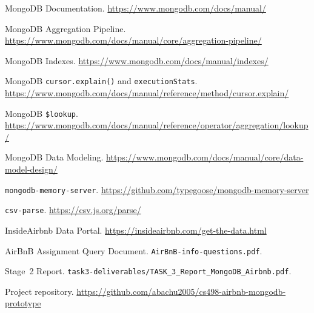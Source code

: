 \documentclass[10pt]{article}
\begin{document}
\begin{enumerate}[label={[\arabic*]}]
\item MongoDB Documentation. \url{https://www.mongodb.com/docs/manual/}
\item MongoDB Aggregation Pipeline. \url{https://www.mongodb.com/docs/manual/core/aggregation-pipeline/}
\item MongoDB Indexes. \url{https://www.mongodb.com/docs/manual/indexes/}
\item MongoDB \texttt{cursor.explain()} and \texttt{executionStats}. \url{https://www.mongodb.com/docs/manual/reference/method/cursor.explain/}
\item MongoDB \texttt{\$lookup}. \url{https://www.mongodb.com/docs/manual/reference/operator/aggregation/lookup/}
\item MongoDB Data Modeling. \url{https://www.mongodb.com/docs/manual/core/data-model-design/}
\item \texttt{mongodb-memory-server}. \url{https://github.com/typegoose/mongodb-memory-server}
\item \texttt{csv-parse}. \url{https://csv.js.org/parse/}
\item InsideAirbnb Data Portal. \url{https://insideairbnb.com/get-the-data.html}
\item AirBnB Assignment Query Document. \texttt{AirBnB-info-questions.pdf}.
\item Stage~2 Report. \texttt{task3-deliverables/TASK\_3\_Report\_MongoDB\_Airbnb.pdf}.
\item Project repository. \url{https://github.com/abachu2005/cs498-airbnb-mongodb-prototype}
\end{enumerate}
\end{document}
